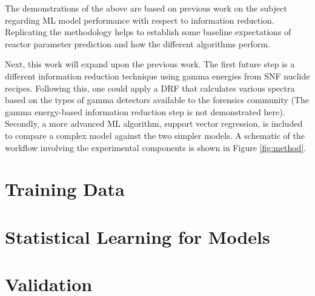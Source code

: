 The demonstrations of the above are based on previous work on the subject
\cite{dayman_feasibility_2013} regarding \gls{ML} model performance
with respect to information reduction.  Replicating the methodology helps to
establish some baseline expectations of reactor parameter prediction and how
the different algorithms perform. 

Next, this work will expand upon the previous work.  The first future step is a
different information reduction technique using gamma energies from \gls{SNF}
nuclide recipes.  Following this, one could apply a \gls{DRF} that calculates
various spectra based on the types of gamma detectors available to the
forensics community (The gamma energy-based information reduction step is not
demonstrated here).  Secondly, a more advanced \gls{ML} algorithm, support
vector regression, is included to compare a complex model against the two
simpler models.  A schematic of the workflow involving the experimental
components is shown in Figure \ref{fig:method}.

\section{Training Data}
\label{sec:training}


\section{Statistical Learning for Models}
\label{sec:statmodel}


\section{Validation}
\label{sec:valid}

